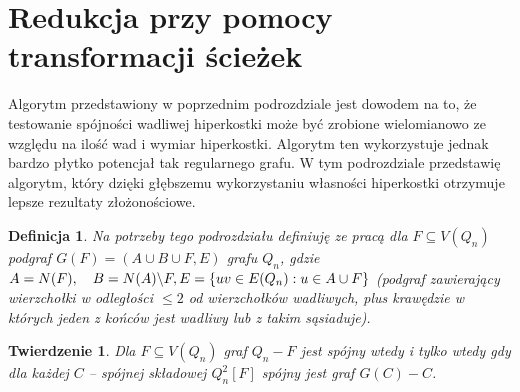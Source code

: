 \documentclass{pracamgr}
\newtheorem{defi}{Definicja}[section] %
\newtheorem{theorem}{Twierdzenie}
\begin{document}
  \section{Redukcja przy pomocy transformacji ścieżek}\label{spojnosc 2}
   Algorytm przedstawiony w poprzednim podrozdziale jest dowodem na to, że testowanie spójności wadliwej hiperkostki może być zrobione wielomianowo
   ze względu na ilość wad i wymiar hiperkostki. Algorytm ten wykorzystuje jednak bardzo płytko potencjał tak regularnego grafu.
   W tym podrozdziale przedstawię algorytm, który dzięki głębszemu wykorzystaniu własności hiperkostki otrzymuje lepsze rezultaty złożonościowe.
   \begin{defi}\label{podgrafy kostki}
    Na potrzeby tego podrozdziału definiuję ze pracą \cite{DFGKR} dla $F\subseteq V(Q_n)$\newline
    podgraf $G(F)=(A\cup B\cup F,E)$ grafu $Q_n$,
    gdzie $A=N(F),\quad B=N(A)\backslash F,\newline E=\{uv\in E(Q_n):u\in A\cup F\}$ (podgraf zawierający wierzchołki w odległości $\le 2$ od wierzchołków wadliwych,
    plus krawędzie w których jeden z końców jest wadliwy lub z takim sąsiaduje).
   \end{defi}
   \begin{theorem}\label{spojnosc z lokalnej spojnosci}
    Dla $F\subseteq V(Q_n)$ graf $Q_n-F$ jest spójny wtedy i tylko wtedy gdy dla każdej $C$ -- spójnej składowej $Q_n^2[F]$ spójny jest graf $G(C)-C$.
   \end{theorem}
\end{document}

